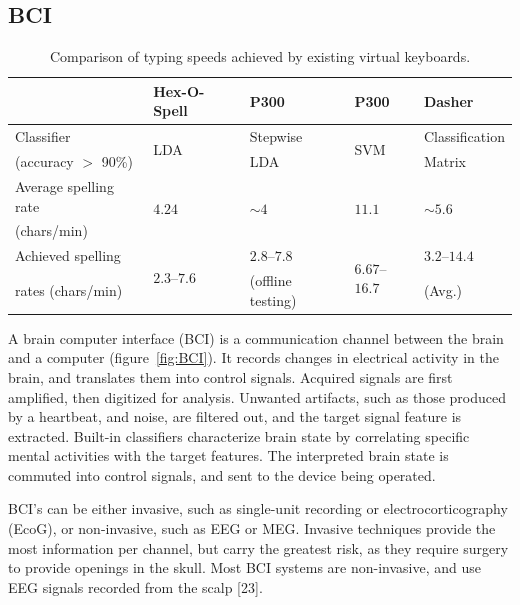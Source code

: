 \documentclass[12pt,titlepage]{article}
\begin{document}
\subsection{BCI}

\begin{table}
\caption{Comparison of typing speeds achieved by existing virtual keyboards.}
\begin{center}
\begin{tabular}{lllll}
\hline\hline
& Hex-O-Spell & P300 & P300 & Dasher\\
\hline
Classifier & \multirow{2}{*}{LDA} & Stepwise & \multirow{2}{*}{SVM} & Classification \\
\quad (accuracy $>$ 90\%) & & LDA  & & Matrix \\
Average spelling rate & \multirow{2}{*}{$4.24$} & \multirow{2}{*}{$\sim4$} & \multirow{2}{*}{$11.1$} & \multirow{2}{*}{$\sim5.6$} \\
\quad (chars/min) & & & & \\
Achieved spelling & \multirow{2}{*}{$2.3$--$7.6$} & $2.8$--$7.8$ & \multirow{2}{*}{$6.67$--$16.7$} & $3.2$--$14.4$ \\
\quad rates (chars/min) & & (offline testing) & & (Avg.) \\
\hline\hline
\end{tabular}
\end{center}
\label{table:BCIComp}
\end{table}

A brain computer interface (BCI) is a communication channel between the brain and a 
computer (figure~\ref{fig:BCI}). It records changes in electrical activity in the brain, and translates them into 
control signals.  Acquired signals are first amplified, then digitized for analysis.  Unwanted 
artifacts, such as those produced by a heartbeat, and noise, are filtered out, and the target signal
feature is extracted.   Built-in classifiers characterize brain state by correlating specific mental 
activities with the target features.  The interpreted brain state is commuted into control signals, and sent 
to the device being operated.

BCI's can be either invasive, such as single-unit recording or electrocorticography (EcoG), or 
non-invasive, such as EEG or MEG.  Invasive techniques provide the most information per 
channel, but carry the greatest risk, as they require surgery to provide openings in the skull. 
Most BCI systems are non-invasive, and use EEG signals recorded from the scalp [23].
\end{document}
